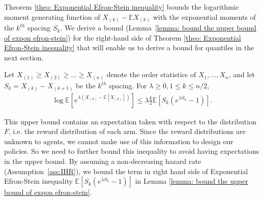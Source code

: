 Theorem \ref{theo: Exponential Efron-Stein inequality} bounds the logarithmic moment generating function of $X_{\left(k\right)}-\mathbb{E} X_{\left(k\right)}$ with the exponential moments of the $k^{th}$ spacing $S_{k}$.
We derive a bound (Lemma~\ref{lemma: bound the upper bound of expon efron-stein})
for the right-hand side of Theorem \ref{theo: Exponential Efron-Stein inequality}
that will enable us to derive a bound for quantiles in the next section.

\begin{theo} 
\label{theo: Exponential Efron-Stein inequality}
Let $X_{\left(1\right)} \geq X_{\left(2\right)} \geq ... \geq X_{\left(n\right)}$ denote the order statistics of $X_1, ..., X_n$, and let $S_{k} = X_{\left(k\right)}-X_{\left(k+1\right)}$ be the $k^{th}$ spacing. For $\lambda \geq 0, 1 \leq k \leq n / 2$,
\begin{align}
    \label{equ: Exponential Efron-Stein inequality}
    \log \mathbb{E}[ e^{\lambda\left(X_{\left(k\right)}-\mathbb{E}[ X_{\left(k\right)}]\right)}]
    \leq \lambda \frac{k}{2} \mathbb{E}\left[S_{k}\left(e^{\lambda S_{k}}-1\right)\right].
\end{align}
\end{theo}

This upper bound contains an expectation taken with respect to the distribution $F$,
i.e. the reward distribution of each arm.
Since the reward distributions are unknown to agents, we cannot make use of this information to design our policies. So we need to further bound this inequality to avoid having expectations in the upper bound.
By assuming a non-decreasing hazard rate (Assumption~\ref{ass:IHR}),
we bound the term in right hand side of Exponential Efron-Stein inequality $\mathbb{E}\left[S_{k}\left(e^{\lambda S_{k}}-1\right)\right]$
in Lemma \ref{lemma: bound the upper bound of expon efron-stein}.


